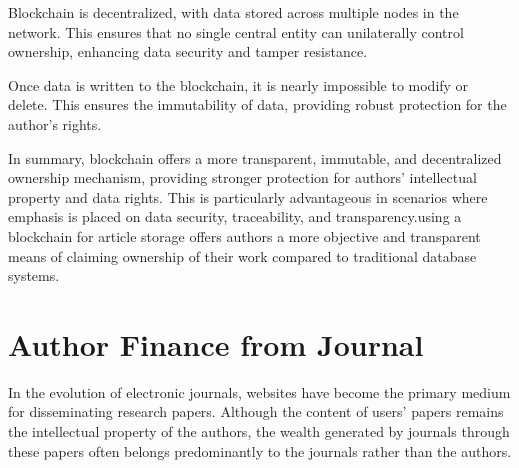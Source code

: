 \documentclass[lettersize,journal]{IEEEtran}
\begin{document}
Blockchain is decentralized, with data stored across multiple nodes in the network. This ensures that no single central entity can unilaterally control ownership, enhancing data security and tamper resistance.

Once data is written to the blockchain, it is nearly impossible to modify or delete. This ensures the immutability of data, providing robust protection for the author's rights.

In summary, blockchain offers a more transparent, immutable, and decentralized ownership mechanism, providing stronger protection for authors' intellectual property and data rights. This is particularly advantageous in scenarios where emphasis is placed on data security, traceability, and transparency.using a blockchain for article storage offers authors a more objective and transparent means of claiming ownership of their work compared to traditional database systems.

\section{Author Finance from Journal}

In the evolution of electronic journals, websites have become the primary medium for disseminating research papers. Although the content of users' papers remains the intellectual property of the authors, the wealth generated by journals through these papers often belongs predominantly to the journals rather than the authors.
\end{document}
